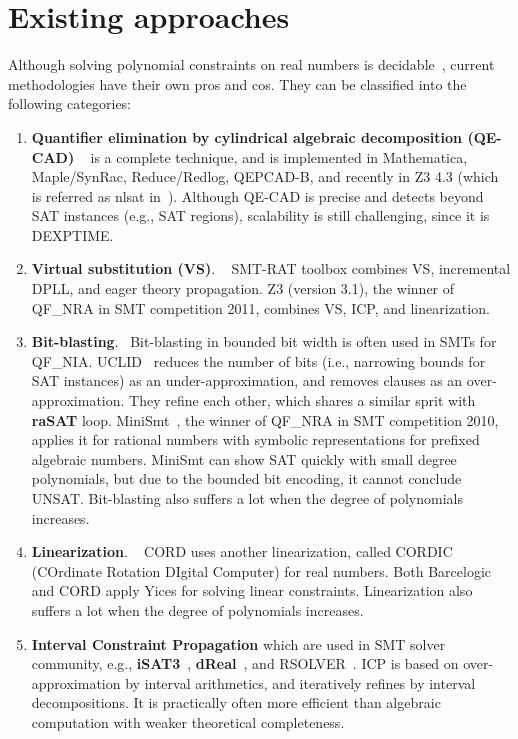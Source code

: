 \section{Existing approaches}
Although solving polynomial constraints on real numbers is decidable~\cite{tarski}, current methodologies have their own pros and cos. They can be classified into the following categories: 
\begin{enumerate}
\item \textbf{Quantifier elimination by cylindrical algebraic decomposition (QE-CAD)} ~\cite{qecad} 
is a complete technique, and 
is implemented in Mathematica, Maple/SynRac, Reduce/Redlog, QEPCAD-B, and recently 
in
Z3 4.3 (which is referred as nlsat in~\cite{Jovanovic13}).
Although QE-CAD is precise and detects beyond SAT instances (e.g., SAT regions), 
scalability is still challenging, since it is DEXPTIME. 

\item \textbf{Virtual substitution (VS)}. ~
SMT-RAT toolbox \cite{smtrat}\cite{vssmt} combines 
VS, incremental DPLL, and %
eager theory propagation. 
Z3 (version 3.1), the winner of QF\_NRA in SMT competition 2011, 
combines VS, ICP, and linearization.

\item \textbf{Bit-blasting}. ~Bit-blasting in bounded bit width is often used in SMTs for QF\_NIA. 
UCLID~\cite{uclid} reduces the number of bits (i.e., narrowing bounds for SAT instances) 
as an under-approximation, and removes clauses as an over-approximation. 
They refine each other, which shares a similar sprit with {\bf raSAT} loop. 
MiniSmt~\cite{minismt}, the winner of QF\_NRA in SMT competition 2010, 
applies it for rational numbers with symbolic representations for prefixed algebraic numbers. 
MiniSmt can show SAT quickly with small degree polynomials, but due to the bounded bit encoding, 
it cannot conclude UNSAT.
Bit-blasting also suffers a lot when the degree of polynomials increases. 

\item \textbf{Linearization}. ~
CORD \cite{cord} uses another linearization, called 
CORDIC (COrdinate Rotation DIgital Computer) for real numbers. 
Both Barcelogic and CORD apply Yices for solving linear constraints.
Linearization also suffers a lot when the degree of polynomials increases. 

\item \textbf{Interval Constraint Propagation} 
which are used in SMT solver community, e.g., {\bf iSAT3}~\cite{isat}, 
{\bf dReal}~\cite{dRealCADE13}, and RSOLVER~\cite{rsolver}. 
ICP is based on over-approximation by interval arithmetics, and iteratively refines by
interval decompositions. 
It is practically often more efficient than algebraic computation 
with weaker theoretical completeness. 
\end{enumerate}

